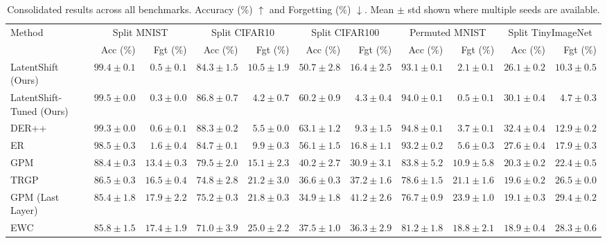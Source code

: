 \begin{table}[t]
\centering
\caption{Consolidated results across all benchmarks. Accuracy (\%) $\uparrow$ and Forgetting (\%) $\downarrow$. Mean $\pm$ std shown where multiple seeds are available.}
\label{tab:summary}
\begin{tabular}{lrrrrrrrrrr}
\toprule
Method & \multicolumn{2}{c}{Split MNIST} & \multicolumn{2}{c}{Split CIFAR10} & \multicolumn{2}{c}{Split CIFAR100} & \multicolumn{2}{c}{Permuted MNIST} & \multicolumn{2}{c}{Split TinyImageNet} \\
\cmidrule(lr){2-3} \cmidrule(lr){4-5} \cmidrule(lr){6-7} \cmidrule(lr){8-9} \cmidrule(lr){10-11}
 & Acc (\%) & Fgt (\%) & Acc (\%) & Fgt (\%) & Acc (\%) & Fgt (\%) & Acc (\%) & Fgt (\%) & Acc (\%) & Fgt (\%) \\
\midrule
LatentShift (Ours) & $99.4 \pm 0.1$ & $0.5 \pm 0.1$ & $84.3 \pm 1.5$ & $10.5 \pm 1.9$ & $50.7 \pm 2.8$ & $16.4 \pm 2.5$ & $93.1 \pm 0.1$ & $2.1 \pm 0.1$ & $26.1 \pm 0.2$ & $10.3 \pm 0.5$ \\
LatentShift-Tuned (Ours) & $99.5 \pm 0.0$ & $0.3 \pm 0.0$ & $86.8 \pm 0.7$ & $4.2 \pm 0.7$ & $60.2 \pm 0.9$ & $4.3 \pm 0.4$ & $94.0 \pm 0.1$ & $0.5 \pm 0.1$ & $30.1 \pm 0.4$ & $4.7 \pm 0.3$ \\
DER++ & $99.3 \pm 0.0$ & $0.6 \pm 0.1$ & $88.3 \pm 0.2$ & $5.5 \pm 0.0$ & $63.1 \pm 1.2$ & $9.3 \pm 1.5$ & $94.8 \pm 0.1$ & $3.7 \pm 0.1$ & $32.4 \pm 0.4$ & $12.9 \pm 0.2$ \\
ER & $98.5 \pm 0.3$ & $1.6 \pm 0.4$ & $84.7 \pm 0.1$ & $9.9 \pm 0.3$ & $56.1 \pm 1.5$ & $16.8 \pm 1.1$ & $93.2 \pm 0.2$ & $5.6 \pm 0.3$ & $27.6 \pm 0.4$ & $17.9 \pm 0.3$ \\
GPM & $88.4 \pm 0.3$ & $13.4 \pm 0.3$ & $79.5 \pm 2.0$ & $15.1 \pm 2.3$ & $40.2 \pm 2.7$ & $30.9 \pm 3.1$ & $83.8 \pm 5.2$ & $10.9 \pm 5.8$ & $20.3 \pm 0.2$ & $22.4 \pm 0.5$ \\
TRGP & $86.5 \pm 0.3$ & $16.5 \pm 0.4$ & $74.8 \pm 2.8$ & $21.2 \pm 3.0$ & $36.6 \pm 0.3$ & $37.2 \pm 1.6$ & $78.6 \pm 1.5$ & $21.1 \pm 1.6$ & $19.6 \pm 0.2$ & $26.5 \pm 0.0$ \\
GPM (Last Layer) & $85.4 \pm 1.8$ & $17.9 \pm 2.2$ & $75.2 \pm 0.3$ & $21.8 \pm 0.3$ & $34.9 \pm 1.8$ & $41.2 \pm 2.6$ & $76.7 \pm 0.9$ & $23.9 \pm 1.0$ & $19.1 \pm 0.3$ & $29.4 \pm 0.2$ \\
EWC & $85.8 \pm 1.5$ & $17.4 \pm 1.9$ & $71.0 \pm 3.9$ & $25.0 \pm 2.2$ & $37.5 \pm 1.0$ & $36.3 \pm 2.9$ & $81.2 \pm 1.8$ & $18.8 \pm 2.1$ & $18.9 \pm 0.4$ & $28.3 \pm 0.6$ \\

\end{tabular}
\end{table}
